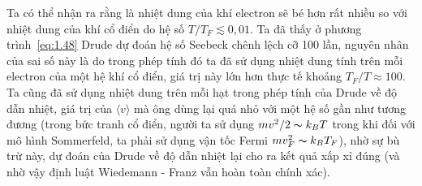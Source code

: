 Ta có thể nhận ra rằng là nhiệt dung của khí electron sẽ bé hơn rất nhiều so với nhiệt dung của khí cổ điển do hệ số $T/T_F \lesssim 0,01$. Ta đã thấy ở phương trình~\eqref{eq:1.48} Drude dự đoán hệ số Seebeck chênh lệch cỡ 100 lần, nguyên nhân của sai số này là do trong phép tính đó 
ta đã sử dụng nhiệt dung tính trên mỗi electron của một hệ khí cổ điển, giá trị này lớn hơn thực tế khoảng $T_F/T \approx 100$.
Ta cũng đã sử dụng nhiệt dung trên mỗi hạt trong phép tính của Drude về độ dẫn nhiệt, giá trị của $\langle v \rangle$ mà ông dùng lại quá nhỏ với một hệ số gần như tương đương (trong bức tranh cổ điển, người ta sử dụng $mv^2/2 \thicksim k_BT$ trong khi đối với mô hình Sommerfeld, ta phải sử dụng vận tốc Fermi
$mv^2_F \thicksim k_BT_F$), nhờ sự bù trừ này, dự đoán của Drude về độ dẫn nhiệt lại cho ra kết quả xấp xỉ đúng (và nhờ vậy định luật Wiedemann - Franz vẫn hoàn toàn chính xác).
